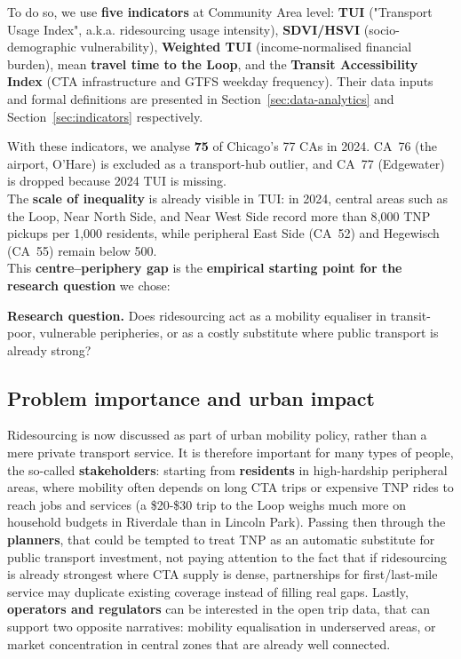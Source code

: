 \documentclass[10pt, a4paper]{article}
\begin{document}
    To do so, we use \textbf{five indicators} at Community Area level: \textbf{TUI} ("Transport Usage Index", a.k.a. ridesourcing usage intensity), \textbf{SDVI/HSVI} (socio-demographic vulnerability), \textbf{Weighted TUI} (income-normalised financial burden), mean \textbf{travel time to the Loop}, and the \textbf{Transit Accessibility Index} (CTA infrastructure and GTFS weekday frequency).
    Their data inputs and formal definitions are presented in Section~\ref{sec:data-analytics} and Section~\ref{sec:indicators} respectively.

    With these indicators, we analyse \textbf{75} of Chicago's 77 CAs in 2024. CA~76 (the airport, O'Hare) is excluded as a transport-hub outlier, and CA~77 (Edgewater) is dropped because 2024 TUI is missing.\\


    The \textbf{scale of inequality} is already visible in TUI: in 2024, central areas such as the Loop, Near North Side, and Near West Side record more than 8{,}000 TNP pickups per 1{,}000 residents, while peripheral East Side (CA~52) and Hegewisch (CA~55) remain below 500.\\
    This \textbf{centre--periphery gap} is the \textbf{empirical starting point for the research question} we chose:
    \begin{highlightbox}
        \textbf{Research question.} Does ridesourcing act as a mobility equaliser in transit-poor, vulnerable peripheries, or as a costly substitute where public transport is already strong?
        \end{highlightbox}


\subsection{Problem importance and urban impact}

    Ridesourcing is now discussed as part of urban mobility policy, rather than a mere private transport service. It is therefore important for many types of people, the so-called \textbf{stakeholders}: starting from \textbf{residents} in high-hardship peripheral areas, where mobility often depends on long CTA trips or expensive TNP rides to reach jobs and services (a \$20-\$30 trip to the Loop weighs much more on household budgets in Riverdale than in Lincoln Park).  Passing then through the \textbf{planners}, that could be tempted to treat TNP as an automatic substitute for public transport investment, not paying attention to the fact that if ridesourcing is already strongest where CTA supply is dense, partnerships for first/last-mile service may duplicate existing coverage instead of filling real gaps.
    Lastly, \textbf{operators and regulators} can be interested in the open trip data, that can support two opposite narratives: mobility equalisation in underserved areas, or market concentration in central zones that are already well connected.
\end{document}
